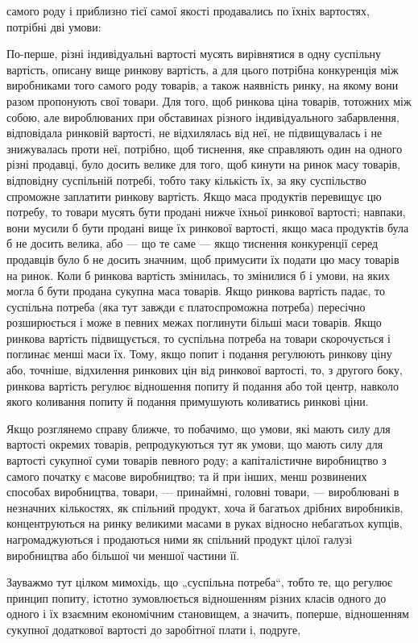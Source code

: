 \parcont{}  %
самого роду і приблизно тієї самої якості продавались по їхніх
вартостях, потрібні дві умови:

По-перше, різні індивідуальні вартості мусять вирівнятися
в одну суспільну вартість, описану вище ринкову вартість, а для
цього потрібна конкуренція між виробниками того самого роду
товарів, а також наявність ринку, на якому вони разом пропонують свої товари. Для того, щоб ринкова
ціна товарів, тотожних між собою, але вироблюваних при обставинах різного
індивідуального забарвлення, відповідала ринковій вартості, не
відхилялась від неї, не підвищувалась і не знижувалась проти
неї, потрібно, щоб тиснення, яке справляють один на одного
різні продавці, було досить велике для того, щоб кинути на
ринок масу товарів, відповідну суспільній потребі, тобто таку
кількість їх, за яку суспільство спроможне заплатити ринкову
вартість. Якщо маса продуктів перевищує цю потребу, то товари мусять бути продані нижче їхньої
ринкової вартості; навпаки,
вони мусили б бути продані вище їх ринкової вартості, якщо
маса продуктів була б не досить велика, або — що те саме — якщо тиснення конкуренції серед продавців
було б не досить
значним, щоб примусити їх подати цю масу товарів на ринок.
Коли б ринкова вартість змінилась, то змінилися б і умови,
на яких могла б бути продана сукупна маса товарів. Якщо ринкова вартість падає, то суспільна потреба
(яка тут завжди
є платоспроможна потреба) пересічно розширюється і може
в певних межах поглинути більші маси товарів. Якщо ринкова
вартість підвищується, то суспільна потреба на товари скорочується і поглинає менші маси їх. Тому,
якщо попит і подання
регулюють ринкову ціну або, точніше, відхилення ринкових цін
від ринкової вартості, то, з другого боку, ринкова вартість регулює відношення попиту й подання або
той центр, навколо
якого коливання попиту й подання примушують коливатись
ринкові ціни.

Якщо розглянемо справу ближче, то побачимо, що умови,
які мають силу для вартості окремих товарів, репродукуються
тут як умови, що мають силу для вартості сукупної суми товарів певного роду; а капіталістичне
виробництво з самого
початку є масове виробництво; та й при інших, менш розвинених способах виробництва, товари, —
принаймні, головні товари, — вироблювані в незначних кількостях, як спільний продукт, хоча й
багатьох дрібних виробників, концентруються на ринку великими масами в руках відносно небагатьох
купців,
нагромаджуються і продаються ними як спільний продукт цілої
галузі виробництва або більшої чи меншої частини її.

Зауважмо тут цілком мимохідь, що „суспільна потреба“,
тобто те, що регулює принцип попиту, істотно зумовлюється
відношенням різних класів одного до одного і їх взаємним
економічним становищем, а значить, поперше, відношенням сукупної додаткової вартості до заробітної
плати і, подруге,
\parbreak{}  %
